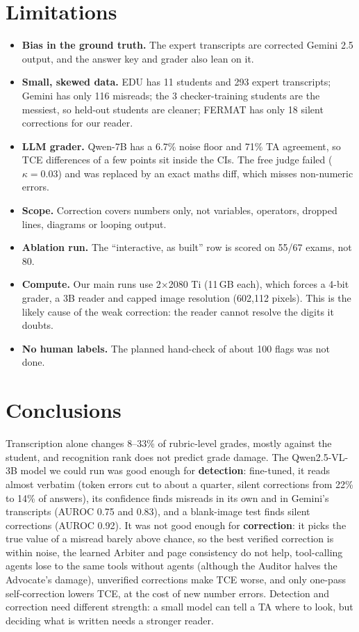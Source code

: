 \documentclass[11pt]{article}
\begin{document}
\section{Limitations}
\begin{itemize}
  \item \textbf{Bias in the ground truth.} The expert transcripts are corrected Gemini 2.5 output, and the answer key and grader also lean on it.
  \item \textbf{Small, skewed data.} EDU has 11 students and 293 expert transcripts; Gemini has only 116 misreads; the 3 checker-training students are the messiest, so held-out students are cleaner; FERMAT has only 18 silent corrections for our reader.
  \item \textbf{LLM grader.} Qwen-7B has a 6.7\% noise floor and 71\% TA agreement, so TCE differences of a few points sit inside the CIs. The free judge failed ($\kappa=0.03$) and was replaced by an exact maths diff, which misses non-numeric errors.
  \item \textbf{Scope.} Correction covers numbers only, not variables, operators, dropped lines, diagrams or looping output.
  \item \textbf{Ablation run.} The ``interactive, as built'' row is scored on 55/67 exams, not 80.
  \item \textbf{Compute.} Our main runs use 2$\times$2080 Ti (11\,GB each), which forces a 4-bit grader, a 3B reader and capped image resolution (602,112 pixels). This is the likely cause of the weak correction: the reader cannot resolve the digits it doubts.
  \item \textbf{No human labels.} The planned hand-check of about 100 flags was not done.
\end{itemize}

\section{Conclusions}
Transcription alone changes 8--33\% of rubric-level grades, mostly against the student, and recognition rank does not predict grade damage. The Qwen2.5-VL-3B model we could run was good enough for \textbf{detection}: fine-tuned, it reads almost verbatim (token errors cut to about a quarter, silent corrections from 22\% to 14\% of answers), its confidence finds misreads in its own and in Gemini's transcripts (AUROC 0.75 and 0.83), and a blank-image test finds silent corrections (AUROC 0.92). It was not good enough for \textbf{correction}: it picks the true value of a misread barely above chance, so the best verified correction is within noise, the learned Arbiter and page consistency do not help, tool-calling agents lose to the same tools without agents (although the Auditor halves the Advocate's damage), unverified corrections make TCE worse, and only one-pass self-correction lowers TCE, at the cost of new number errors. Detection and correction need different strength: a small model can tell a TA where to look, but deciding what is written needs a stronger reader.
\end{document}
